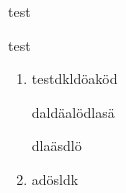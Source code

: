 \documentclass[a4paper,12pt]{article}
\begin{document}
test

\begin{langesbeispiel} \item[0] %
test
\end{langesbeispiel}

\begin{beispiel}{0} %
\blindtext

\end{beispiel}

\begin{enumerate}
\item testdkldöaköd

daldäalödlasä

dlaäsdlö

\item adösldk
\end{enumerate}
\end{document}
